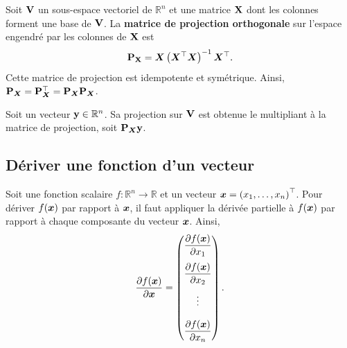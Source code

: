 Soit $\bold V$ un sous-espace vectoriel de $\mathbb{R}^n$ et une matrice $\bold X$ dont les colonnes forment une base de $\bold V$. La \textbf{matrice de projection orthogonale} sur l'espace engendré par les colonnes de $\bold X$ est 
$$ \bold P_{\bold X} = \bm{X} \left( \bm{X}^\top \bm{X}\right)^{-1} \bm{X}^\top. $$
Cette matrice de projection est idempotente et symétrique. Ainsi, $\bold P_{\bm{X}} = \bold P_{\bm{X}}^\top = \bold P_{\bm{X}} \bold P_{\bm{X}}$.

Soit un vecteur $\bold y \in \mathbb{R}^n$. Sa projection sur $\bold V$ est obtenue le multipliant à la matrice de projection, soit $\bold P_{\bm{X}} \bold y$.

\subsection{Dériver une fonction d'un vecteur}
\label{sec:Deriver}

Soit une fonction scalaire $f: \mathbb{R}^n \rightarrow \mathbb{R}$ et un vecteur $\bm{x} = \left( x_1, \dots, x_n\right)^\top$. Pour dériver $f(\bm{x})$ par rapport à $\bm{x}$, il faut appliquer la dérivée partielle à $f(\bm{x})$ par rapport à chaque composante du vecteur $\bm{x}$. Ainsi,
\begin{align*}
\frac{\partial f(\bm{x})}{ \partial \bm{x}} =
    \begin{pmatrix}
       \displaystyle \frac{\partial f(\bm{x})}{\partial x_1} \\[4mm]
       \displaystyle \frac{\partial f(\bm{x})}{\partial x_2} \\[4mm]
       \displaystyle \vdots\\[4mm]
       \displaystyle \frac{\partial f(\bm{x})}{\partial x_n} 
    \end{pmatrix}.
\end{align*}

